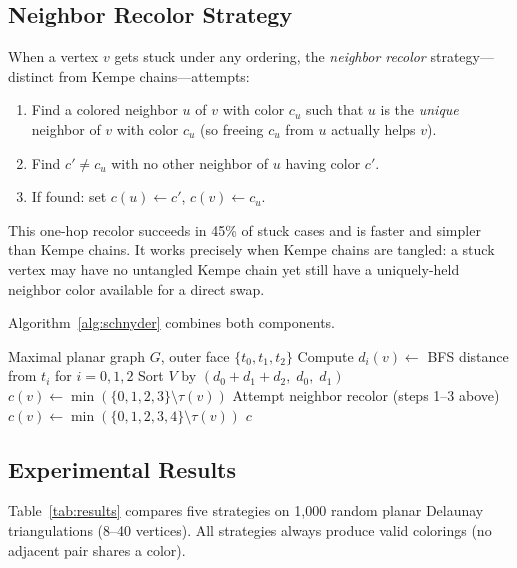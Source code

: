 \documentclass[11pt,twocolumn]{article}
\begin{document}
\subsection{Neighbor Recolor Strategy}

When a vertex $v$ gets stuck under any ordering, the \emph{neighbor recolor}
strategy---distinct from Kempe chains---attempts:
\begin{enumerate}[noitemsep]
  \item Find a colored neighbor $u$ of $v$ with color $c_u$ such that $u$ is the
        \emph{unique} neighbor of $v$ with color $c_u$ (so freeing $c_u$ from
        $u$ actually helps $v$).
  \item Find $c'\ne c_u$ with no other neighbor of $u$ having color $c'$.
  \item If found: set $c(u)\gets c'$, $c(v)\gets c_u$.
\end{enumerate}

This one-hop recolor succeeds in 45\% of stuck cases and is faster and simpler
than Kempe chains. It works precisely when Kempe chains are tangled: a stuck
vertex may have no untangled Kempe chain yet still have a uniquely-held neighbor
color available for a direct swap.

Algorithm~\ref{alg:schnyder} combines both components.

\begin{algorithm}[t]
\caption{Schnyder-Ordered Recoloring}
\label{alg:schnyder}
\begin{algorithmic}[1]
\Require Maximal planar graph $G$, outer face $\{t_0,t_1,t_2\}$
\State Compute $d_i(v)\gets$ BFS distance from $t_i$ for $i=0,1,2$
\State Sort $V$ by $(d_0+d_1+d_2,\; d_0,\; d_1)$
    \State $c(v)\gets\min(\{0,1,2,3\}\setminus\tau(v))$
  \Else
    \State Attempt neighbor recolor (steps 1--3 above)
     $c(v)\gets\min(\{0,1,2,3,4\}\setminus\tau(v))$
    \EndIf
  \EndIf
\EndFor
\State\Return $c$
\end{algorithmic}
\end{algorithm}

\subsection{Experimental Results}

Table~\ref{tab:results} compares five strategies on 1{,}000 random planar
Delaunay triangulations (8--40 vertices). All strategies always produce valid
colorings (no adjacent pair shares a color).
\end{document}
